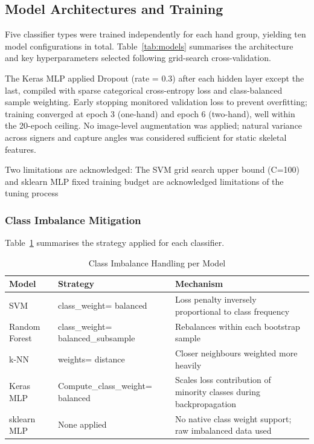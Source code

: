 \documentclass[conference]{IEEEtran}
\begin{document}
\subsection{Model Architectures and Training}

Five classifier types were trained independently for each hand group, yielding ten model configurations in total. Table~\ref{tab:models} summarises the architecture and key hyperparameters selected following grid-search cross-validation.

The Keras MLP applied Dropout (rate = 0.3) after each hidden layer except the last, compiled with sparse categorical cross-entropy loss and class-balanced sample weighting. Early stopping monitored validation loss to prevent overfitting; training converged at epoch 3 (one-hand) and epoch 6 (two-hand), well within the 20-epoch ceiling. No image-level augmentation was applied; natural variance across signers and capture angles was considered sufficient for static skeletal features.

Two limitations are acknowledged: The SVM grid search upper bound (C=100) and sklearn MLP fixed training budget are acknowledged limitations of the tuning process

\subsubsection{Class Imbalance Mitigation}

Table~\ref{tab:imbalance} summarises the strategy applied for each classifier.

\begin{table}[H]
  \caption{Class Imbalance Handling per Model}
  \label{tab:imbalance}
  \centering
  \begin{tabular}{>{\raggedright\arraybackslash}p{1.8cm} >{\raggedright\arraybackslash}p{2.8cm} >{\raggedright\arraybackslash}p{2.6cm}}
    \toprule
    \textbf{Model} & \textbf{Strategy} & \textbf{Mechanism} \\
    \midrule
    SVM &
      class\_weight= balanced &
      Loss penalty inversely proportional to class frequency \\
    \addlinespace
    Random Forest &
      class\_weight= balanced\_subsample &
      Rebalances within each bootstrap sample \\
    \addlinespace
    k-NN &
      weights= distance &
      Closer neighbours weighted more heavily \\
    \addlinespace
    Keras MLP &
      Compute\_class\_weight= balanced &
      Scales loss contribution of minority classes during backpropagation \\
    \addlinespace
    sklearn MLP &
      None applied &
      No native class weight support; raw imbalanced data used \\
    \bottomrule
  \end{tabular}
\end{table}
\end{document}
